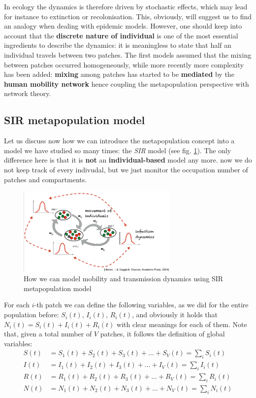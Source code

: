 \documentclass[../main/main.tex]{subfiles}
\begin{document}
In ecology the dynamics is therefore driven by stochastic effects, which may lead for instance to extinction or recolonisation. This, obviously, will suggest us to find an analogy when dealing with epidemic models. However, one should keep into account that the \textbf{discrete nature of individual} is one of the most essential ingredients to describe the dynamics: it is meaningless to state that half an individual travels between two patches. The first models assumed that the mixing between patches occurred homogeneously, while more recently more complexity has been added: \textbf{mixing} among patches has started to be \textbf{mediated} by the \textbf{human mobility network} hence coupling the metapopulation perspective with network theory.


\subsection{SIR metapopulation model}

Let us discuss now how we can introduce the metapopulation concept into a model we have studied so many times: the \textit{SIR} model (see fig. \ref{fig:13_06}). The only difference here is that it is \textbf{not} an \textbf{individual-based} model any more. now we do not keep track of every indivudal, but we just monitor the occupation number of patches and compartments.

\begin{figure}[h!]
\centering
\includegraphics[width=0.7\textwidth]{../lessons/image/14/image06.png}
\caption{\label{fig:13_06} How we can model mobility and transmission dynamics using SIR metapopulation model}
\end{figure}

For each $i$-th patch we can define the following variables, as we did for the entire population before: $S_i(t)$, $I_i(t)$, $R_i(t)$, and obviously it holds that $N_i(t) = S_i(t) + I_i(t) + R_i(t)$ with clear meanings for each of them. Note that, given a total number of $V$ patches, it follows the definition of global variables:
\begin{subequations}
\begin{align}
    S(t) &= S_1(t) + S_2(t) + S_3(t) + ... + S_V(t) = \sum_i S_i(t) \\
    I(t) &= I_1(t) + I_2(t) + I_3(t) + ... + I_V(t) = \sum_i I_i(t) \\
    R(t) &= R_1(t) + R_2(t) + R_3(t) + ... + R_V(t) = \sum_i R_i(t) \\
    N(t) &= N_1(t) + N_2(t) + N_3(t) + ... + N_V(t) = \sum_i N_i(t)
\end{align}
\end{subequations}
\end{document}
